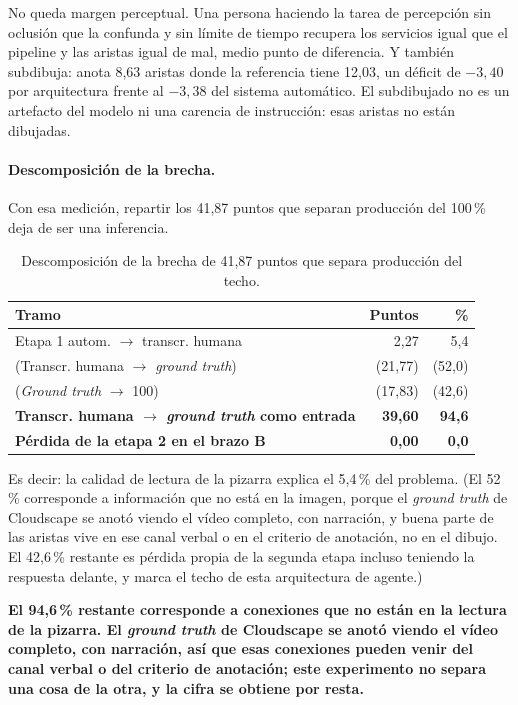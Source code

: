 \documentclass[a4paper, twocolumn, 10pt]{IEEEtran}
\newcommand{\nuevo}[1]{{\bfseries #1}}
\newcommand{\quitado}[1]{(#1)}
\begin{document}
No queda margen perceptual. Una persona haciendo la tarea de percepción sin oclusión que la confunda y sin límite de tiempo recupera los servicios igual que el pipeline y las aristas igual de mal, medio punto de diferencia. Y también subdibuja: anota 8,63 aristas donde la referencia tiene 12,03, un déficit de $-3{,}40$ por arquitectura frente al $-3{,}38$ del sistema automático. El subdibujado no es un artefacto del modelo ni una carencia de instrucción: esas aristas no están dibujadas.

\paragraph{Descomposición de la brecha.}
Con esa medición, repartir los 41,87 puntos que separan producción del 100\,\% deja de ser una inferencia.

\begin{table}[H]
\centering\small\setlength{\tabcolsep}{4pt}
\caption{Descomposición de la brecha de 41,87 puntos que separa producción del techo.}
\label{tab:tramos}
\begin{tabular}{lrr}
\toprule
Tramo & Puntos & \%\\
\midrule
Etapa 1 autom. $\rightarrow$ transcr. humana & 2,27 & 5,4\\
\quitado{Transcr. humana $\rightarrow$ \emph{ground truth}} & \quitado{21,77} & \quitado{52,0}\\
\quitado{\emph{Ground truth} $\rightarrow$ 100} & \quitado{17,83} & \quitado{42,6}\\
\nuevo{Transcr. humana $\rightarrow$ \emph{ground truth} como entrada} & \nuevo{39,60} & \nuevo{94,6}\\
\nuevo{Pérdida de la etapa 2 en el brazo B} & \nuevo{0,00} & \nuevo{0,0}\\
\bottomrule
\end{tabular}
\end{table}

Es decir: la calidad de lectura de la pizarra explica el 5,4\,\% del problema. \quitado{El 52\,\% corresponde a información que no está en la imagen, porque el \emph{ground truth} de Cloudscape se anotó viendo el vídeo completo, con narración, y buena parte de las aristas vive en ese canal verbal o en el criterio de anotación, no en el dibujo. El 42,6\,\% restante es pérdida propia de la segunda etapa incluso teniendo la respuesta delante, y marca el techo de esta arquitectura de agente.}

\nuevo{El 94,6\,\% restante corresponde a conexiones que no están en la lectura de la pizarra. El \emph{ground truth} de Cloudscape se anotó viendo el vídeo completo, con narración, así que esas conexiones pueden venir del canal verbal o del criterio de anotación; este experimento no separa una cosa de la otra, y la cifra se obtiene por resta.}
\end{document}
